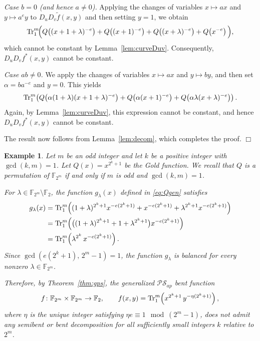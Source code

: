\documentclass[12pt]{article}
\theoremstyle{plain}
\newtheorem{example}{Example}[section]
\theoremstyle{definition}
\renewcommand{\to}{\rightarrow}
\newcommand{\Tr}{{\rm Tr}}
\begin{document}
	\medskip
	
	\noindent
	\emph{Case $b=0$ (and hence $a\neq 0$).}
	Applying the changes of variables $x \mapsto ax$ and $y \mapsto a^{e}y$ to
	$D_u D_v \widetilde{f}(x,y)$ and then setting $y=1$, we obtain
	\[
	\Tr_1^{m}\!\Big(
	Q\!\left((x+1+\lambda)^{-e}\right)
	+ Q\!\left((x+1)^{-e}\right)
	+ Q\!\left((x+\lambda)^{-e}\right)
	+ Q\!\left(x^{-e}\right)
	\Big),
	\]
	which cannot be constant by Lemma~\ref{lem:curveDuv}. Consequently,
	$D_u D_v f^{\ast}(x,y)$ cannot be constant.
	
	\medskip
	
	\noindent
	\emph{Case $ab\neq 0$.}
	We apply the changes of variables $x \mapsto ax$ and $y \mapsto by$, and then set
	$\alpha = b a^{-e}$ and $y=0$. This yields
	\[
	\Tr_1^{m}\!\left(
	Q\!\left(\alpha (1+\lambda)(x+1+\lambda)^{-e}\right)
	+ Q\!\left(\alpha (x+1)^{-e}\right)
	+ Q\!\left(\alpha \lambda(x+\lambda)^{-e}\right)
	\right).
	\]
	Again, by Lemma~\ref{lem:curveDuv}, this expression cannot be constant, and hence
	$D_u D_v f^{\ast}(x,y)$ cannot be constant.
	
	\medskip
	
	The result now follows from Lemma~\ref{lem:decom}, which completes the proof.
	\hfill$\Box$
	
	\begin{example}
		Let $m$ be an odd integer and let $k$ be a positive integer with $\gcd(k,m)=1$. 
		Let $Q(x)=x^{2^k+1}$ be the Gold function. We recall that $Q$ is a permutation of $\mathbb{F}_{2^{m}}$ if and only if $m$ is odd and $\gcd(k,m)=1$. 
		
		For $\lambda \in \mathbb{F}_{2^{m}} \setminus \mathbb{F}_{2}$, the function $g_\lambda(x)$ defined in \eqref{eq:Qgen} satisfies
		\begin{align*}
			g_\lambda(x)
			&= \Tr_1^{m}\!\left(
			(1+\lambda)^{2^k+1} x^{-e(2^k+1)}
			+ x^{-e(2^k+1)}
			+ \lambda^{2^k+1} x^{-e(2^k+1)}
			\right) \\
			&= \Tr_1^{m}\!\left(
			\big((1+\lambda)^{2^k+1}+1+\lambda^{2^k+1}\big)
			x^{-e(2^k+1)}
			\right) \\
			&= \Tr_1^{m}\!\left(
			\lambda^{2^k}\, x^{-e(2^k+1)}
			\right).
		\end{align*}
		Since $\gcd(e(2^k+1),\,2^m-1)=1$, the function $g_\lambda$ is balanced for every nonzero $\lambda \in \mathbb{F}_{2^{m}}$. 
		
		Therefore, by Theorem~\ref{thm:gps}, the generalized $\mathcal{PS}_{ap}$ bent function 
		\[
		f \colon \mathbb{F}_{2^{m}} \times \mathbb{F}_{2^{m}} \to \mathbb{F}_2,
		\qquad 
		f(x,y)= \Tr_1^{m}\!\left(x^{2^k+1}\,y^{-\eta(2^k+1)}\right),
		\]
		where $\eta$ is the unique integer satisfying $\eta e \equiv 1 \mod{(2^{m}-1)}$, 
		does not admit any semibent or bent decomposition for all sufficiently small integers $k$ relative to $2^{m}$.
	\end{example}
	
\end{document}
